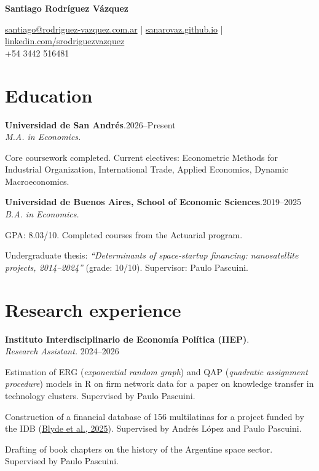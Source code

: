 \documentclass[11pt]{article}
\newcommand{\cvname}{Santiago Rodríguez Vázquez}
\newcommand{\entrydate}[1]{\hfill{\small{#1}}}
\begin{document}
\thispagestyle{firstpage}

{\LARGE\bfseries {\cvname}}

\href{mailto:santiago@rodriguez-vazquez.com.ar}{santiago@rodriguez-vazquez.com.ar} | \href{https://sanarovaz.github.io}{sanarovaz.github.io} | \href{https://www.linkedin.com/in/srodriguezvazquez/?locale=en-US}{linkedin.com/srodriguezvazquez}
\\
+54 3442 516481


\section{Education}
\textbf{Universidad de San Andrés}.\entrydate{2026--Present}\\
\textit{M.A. in Economics.}
\begin{cvitems}
  \item Core coursework completed. Current electives: Econometric Methods for Industrial Organization, International Trade, Applied Economics, Dynamic Macroeconomics.
\end{cvitems}

\smallskip
\textbf{Universidad de Buenos Aires, School of Economic Sciences}.\entrydate{2019--2025}\\
\textit{B.A. in Economics.}
\begin{cvitems}
  \item GPA: 8.03/10. Completed courses from the Actuarial program.
  \item Undergraduate thesis: \emph{``Determinants of space-startup financing:
        nanosatellite projects, 2014--2024''} (grade: 10/10). Supervisor: Paulo Pascuini.
\end{cvitems}

\section{Research experience}
\textbf{Instituto Interdisciplinario de Economía Política (IIEP)}.
\\
\textit{Research Assistant.} \entrydate{2024--2026}
\begin{cvitems}
    \item Estimation of ERG (\textit{exponential random graph}) and QAP (\textit{quadratic assignment procedure}) models in R on firm network data for a paper on knowledge transfer in technology clusters. Supervised by Paulo Pascuini.
    \item Construction of a financial database of 156 multilatinas for a project funded by the IDB (\href{https://publications.iadb.org/es/multilatinas-en-movimiento-caracteristicas-motivaciones-y-lineamientos-de-politica}{Blyde et al., 2025}). Supervised by Andrés López and Paulo Pascuini.
    \item Drafting of book chapters on the history of the Argentine space sector. Supervised by Paulo Pascuini.
\end{cvitems}
\end{document}

